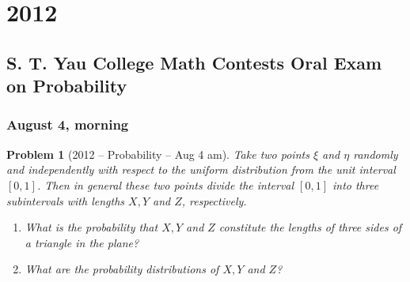\documentclass[12pt]{amsart}
\newtheorem{problem}{Problem}
\begin{document}
\section*{2012}
\subsection*{S. T. Yau College Math Contests Oral Exam on Probability}

\subsubsection*{August 4, morning}
\begin{problem}[2012 -- Probability -- Aug 4 am]
Take two points $\xi$ and $\eta$ randomly and independently with respect to the uniform distribution from the unit interval $[0,1]$. Then in general these two points divide the interval $[0,1]$ into three subintervals with lengths $X, Y$ and $Z$, respectively.
\begin{enumerate}[label=(\alph*)]
\item What is the probability that $X, Y$ and $Z$ constitute the lengths of three sides of a triangle in the plane?
\item What are the probability distributions of $X, Y$ and $Z$?
\end{enumerate}
\end{problem}
\end{document}
